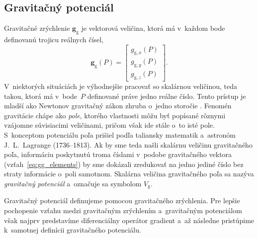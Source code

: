 \documentclass[a4paper, 12pt]{book}
\newcommand{\gidx}{\mathrm g}
\let\vec\mathbf
\begin{document}
\subsection{Gravitačný potenciál}
\label{sec:vg}

Gravitačné zrýchlenie $\vec g_\gidx$ je vektorová veličina, ktorá má v~každom 
bode definovanú trojicu reálnych čísel,
%
\begin{equation}
\label{eq:gg_elements}
\vec g_{\gidx}(P) =
\begin{bmatrix}
g_{\gidx,x}(P) \\[2ex]
g_{\gidx,y}(P) \\[2ex]
g_{\gidx,z}(P)
\end{bmatrix}
{.}
\end{equation}
%
V~niektorých situáciách je výhodnejšie pracovať so skalárnou veličinou, teda 
takou, ktorá má v~bode~$P$ definované práve jedno reálne číslo.  Tento prístup 
je mladší ako Newtonov gravitačný zákon zhruba o~jedno storočie 
\citep{MacMillan1930,Jekeli2015}.  Fenomén gravitácie chápe ako \emph{pole}, 
ktorého vlastnosti môžu byť popísané rôznymi vzájomne súvisiacimi veličinami, 
pričom však ide stále o~to isté pole.  S~konceptom potenciálu poľa prišiel 
podľa \cite{MacMillan1930} taliansky matematik a~astronóm J.~L.~Lagrange 
(1736--1813).  Ak by sme teda našli skalárnu veličinu gravitačného poľa, 
informáciu poskytnutú troma číslami v~podobe gravitačného vektora 
(vzťah~\ref{eq:gg_elements}) by sme dokázali zredukovať na jedno jediné číslo 
bez straty informácie o~poli samotnom.  Skalárna veličina gravitačného poľa sa 
nazýva \emph{gravitačný potenciál} a~označuje sa symbolom $V_\gidx$.

Gravitačný potenciál definujeme pomocou gravitačného zrýchlenia.  Pre lepšie 
pochopenie vzťahu medzi gravitačným zrýchlením a~gravitačným potenciálom však 
najprv predstavíme diferenciálny operátor gradient a~až následne pristúpime 
k~samotnej definícii gravitačného potenciálu.
\end{document}
